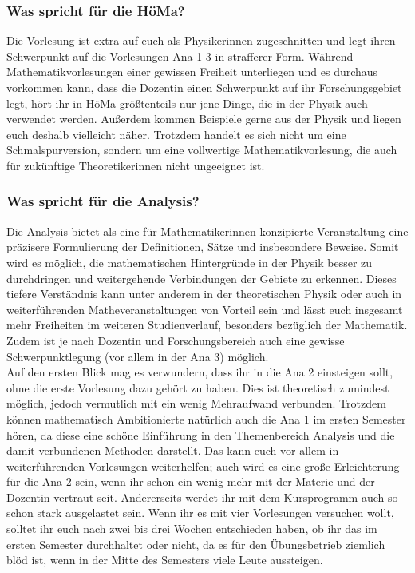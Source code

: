 \subsubsection{Was spricht für die HöMa?}
Die Vorlesung ist extra auf euch als Physikerinnen zugeschnitten und legt ihren Schwerpunkt auf die Vorlesungen \gls{Ana} 1-3 in strafferer Form. Während Mathematikvorlesungen einer gewissen Freiheit unterliegen und es durchaus vorkommen kann, dass die Dozentin einen Schwerpunkt auf ihr Forschungsgebiet legt, hört ihr in HöMa größtenteils nur jene Dinge, die in der Physik auch verwendet werden. Außerdem kommen Beispiele gerne aus der Physik und liegen euch deshalb vielleicht näher. Trotzdem handelt es sich nicht um eine Schmalspurversion, sondern um eine vollwertige Mathematikvorlesung, die auch für zukünftige Theoretikerinnen nicht ungeeignet ist.

\vspace{-2mm}
\subsubsection{Was spricht für die Analysis?}
Die Analysis bietet als eine für Mathematikerinnen konzipierte Veranstaltung eine präzisere Formulierung der Definitionen, Sätze und insbesondere Beweise. Somit wird es möglich, die mathematischen Hintergründe in der Physik besser zu durchdringen und weitergehende Verbindungen der Gebiete zu erkennen. Dieses tiefere Verständnis kann unter anderem in der theoretischen Physik oder auch in weiterführenden Matheveranstaltungen von Vorteil sein und lässt euch insgesamt mehr Freiheiten im weiteren Studienverlauf, besonders bezüglich der Mathematik. Zudem ist je nach Dozentin und Forschungsbereich auch eine gewisse Schwerpunktlegung (vor allem in der \gls{Ana} 3) möglich.\\

Auf den ersten Blick mag es verwundern, dass ihr in die \gls{Ana} 2 einsteigen sollt, ohne die erste Vorlesung dazu gehört zu haben. Dies ist theoretisch zumindest möglich, jedoch vermutlich mit ein wenig Mehraufwand verbunden. Trotzdem können mathematisch Ambitionierte natürlich auch die \gls{Ana} 1 im ersten Semester hören, da diese eine schöne Einführung in den Themenbereich Analysis und die damit verbundenen Methoden darstellt. Das kann euch vor allem in weiterführenden Vorlesungen weiterhelfen; auch wird es eine große Erleichterung für die \gls{Ana} 2 sein, wenn ihr schon ein wenig mehr mit der Materie und der Dozentin vertraut seit. Andererseits werdet ihr mit dem Kursprogramm auch so schon stark ausgelastet sein. Wenn ihr es mit vier Vorlesungen versuchen wollt, solltet ihr euch nach zwei bis drei Wochen entschieden haben, ob ihr das im ersten Semester durchhaltet oder nicht, da es für den Übungsbetrieb ziemlich blöd ist, wenn in der Mitte des Semesters viele Leute aussteigen.

